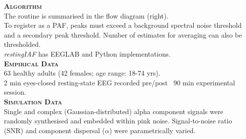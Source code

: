 \documentclass[landscape,a0paper,fontscale=.235]{xebaposter} %
\begin{document}
\begin{poster}
{\textbf{\textsc{Algorithm}}
\\The routine is summarised in the flow diagram (right).
\\To register as a PAF, peaks must exceed a background spectral noise threshold and a secondary peak threshold. Number of estimates for averaging can also be thresholded.
\\ \emph{restingIAF} has EEGLAB and Python implementations.
\\[.25cm]
\textbf{\textsc{Empirical Data}}
\\63 healthy adults (42 females; age range: 18-74 yrs).
\\2 min eyes-closed resting-state EEG recorded pre/post ~90 min experimental session.
\\[.25cm]
\textbf{\textsc{Simulation Data}}
\\Single and complex (Gaussian-distributed) alpha component signals were randomly synthesised and embedded within pink noise. Signal-to-noise ratio (SNR) and component dispersal ($\alpha$) were parametrically varied.

}






\end{poster}
\end{document}

